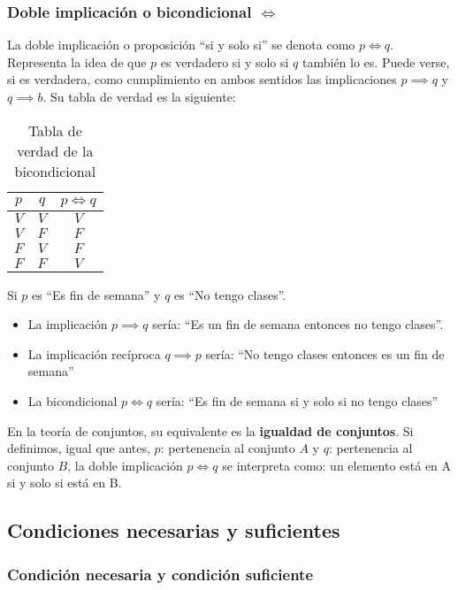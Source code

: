 \subsubsection{Doble implicación o bicondicional $\iff$}
 La doble implicación o proposición ``si y solo si'' se denota como $p \iff q$. Representa la idea de que $p$ es verdadero si y solo si $q$ también lo es. Puede verse, si es verdadera, como cumplimiento en ambos sentidos las implicaciones $p \implies q$ y $q \implies b$. Su tabla de verdad es la siguiente:

\begin{table}[H]
	\centering
	\begin{tabular}{|c|c|c|} \hline
		$p$ & $q$ & $p \iff q$ \\ \hline
		$V$ & $V$ & $V$ \\
		$V$ & $F$ & $F$ \\
		$F$ & $V$ & $F$ \\
		$F$ & $F$ & $V$ \\ \hline
	\end{tabular}
	\caption{Tabla de verdad de la bicondicional}
	\label{tab:bicondicional}
\end{table}

\begin{fmd-example}
	Si $p$ es ``Es fin de semana'' y $q$ es ``No tengo clases''.
	\begin{itemize}
		\item La implicación $p \implies q$ sería: ``Es un fin de semana entonces no tengo clases''.
		\item La implicación recíproca $q \implies p$ sería: ``No tengo clases entonces es un fin de semana''
		\item La bicondicional $p \iff q$ sería: ``Es fin de semana si y solo si no tengo clases''
	\end{itemize}
\end{fmd-example}

En la teoría de conjuntos, su equivalente es la \textbf{igualdad de conjuntos}. Si definimos, igual que antes, $p$: pertenencia al conjunto $A$ y $q$: pertenencia al conjunto $B$, la doble implicación $p \iff q$ se interpreta como: un elemento está en A si y solo si está en B.

\subsection{Condiciones necesarias y suficientes}

\subsubsection{Condición necesaria y condición suficiente}

